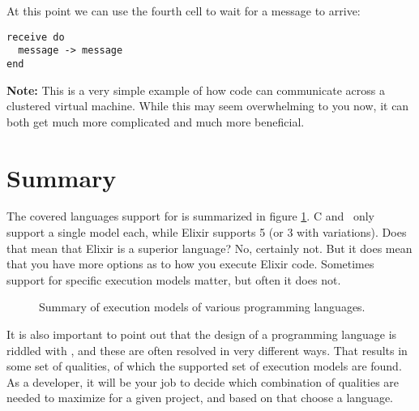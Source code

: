 At this point we can use the fourth cell to wait for a message to arrive:

\begin{verbatim}
receive do
  message -> message
end
\end{verbatim}

\textbf{Note:} This is a very simple example of how code can communicate across a clustered virtual machine. While this may seem overwhelming to you now, it can both get much more complicated and much more beneficial.

\section{Summary}

The covered languages support for  is summarized in figure \ref{fig:first:phases:summary}. C and \csharp\ only support a single model each, while Elixir supports 5 (or 3 with variations). Does that mean that Elixir is a superior language? No, certainly not. But it does mean that you have more options as to how you execute Elixir code. Sometimes support for specific execution models matter, but often it does not.

\begin{figure}[tbp]
  
  \caption{Summary of execution models of various programming languages.}
  \label{fig:first:phases:summary}
\end{figure}

It is also important to point out that the design of a programming language is riddled with , and these are often resolved in very different ways. That results in some set of qualities, of which the supported set of execution models are found. As a developer, it will be your job to decide which combination of qualities are needed to maximize  for a given project, and based on that choose a language.



